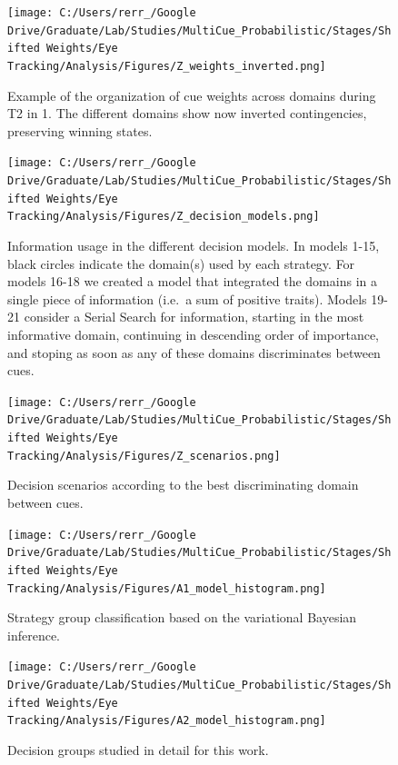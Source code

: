 \documentclass[
  english,
  man]{apa6}
\begin{document}
\begin{figure}
\centering
\texttt{[image: C:/Users/rerr\_/Google Drive/Graduate/Lab/Studies/MultiCue\_Probabilistic/Stages/Shifted Weights/Eye Tracking/Analysis/Figures/Z\_weights\_inverted.png]}
\caption{\label{fig:weights-inverted}Example of the organization of cue weights across domains during T2 in 1. The different domains show now inverted contingencies, preserving winning states.}
\end{figure}

\begin{figure}
\centering
\texttt{[image: C:/Users/rerr\_/Google Drive/Graduate/Lab/Studies/MultiCue\_Probabilistic/Stages/Shifted Weights/Eye Tracking/Analysis/Figures/Z\_decision\_models.png]}
\caption{\label{fig:decision-models}Information usage in the different decision models. In models 1-15, black circles indicate the domain(s) used by each strategy. For models 16-18 we created a model that integrated the domains in a single piece of information (i.e.~a sum of positive traits). Models 19-21 consider a Serial Search for information, starting in the most informative domain, continuing in descending order of importance, and stoping as soon as any of these domains discriminates between cues.}
\end{figure}

\begin{figure}
\centering
\texttt{[image: C:/Users/rerr\_/Google Drive/Graduate/Lab/Studies/MultiCue\_Probabilistic/Stages/Shifted Weights/Eye Tracking/Analysis/Figures/Z\_scenarios.png]}
\caption{\label{fig:scenarios}Decision scenarios according to the best discriminating domain between cues.}
\end{figure}

\begin{figure}
\centering
\texttt{[image: C:/Users/rerr\_/Google Drive/Graduate/Lab/Studies/MultiCue\_Probabilistic/Stages/Shifted Weights/Eye Tracking/Analysis/Figures/A1\_model\_histogram.png]}
\caption{\label{fig:classification}Strategy group classification based on the variational Bayesian inference.}
\end{figure}

\begin{figure}
\centering
\texttt{[image: C:/Users/rerr\_/Google Drive/Graduate/Lab/Studies/MultiCue\_Probabilistic/Stages/Shifted Weights/Eye Tracking/Analysis/Figures/A2\_model\_histogram.png]}
\caption{\label{fig:classification-reduced}Decision groups studied in detail for this work.}
\end{figure}
\end{document}
